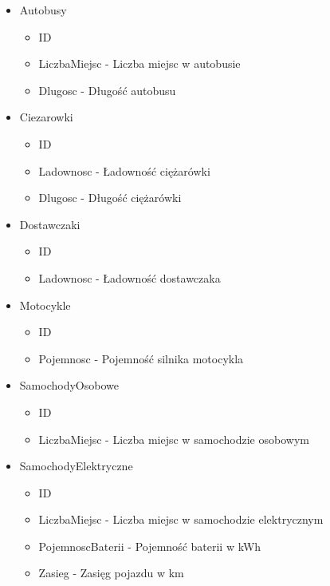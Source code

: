 \begin{itemize}
    \item Autobusy
    \begin{itemize}
        \item ID
        \item LiczbaMiejsc - Liczba miejsc w autobusie
        \item Dlugosc - Długość autobusu
    \end{itemize}
\end{itemize}
\begin{itemize}
    \item Ciezarowki
    \begin{itemize}
        \item ID
        \item Ladownosc - Ładowność ciężarówki
        \item Dlugosc - Długość ciężarówki
    \end{itemize}
\end{itemize}
\begin{itemize}
    \item Dostawczaki
    \begin{itemize}
        \item ID
        \item Ladownosc - Ładowność dostawczaka
    \end{itemize}
\end{itemize}
\begin{itemize}
    \item Motocykle
    \begin{itemize}
        \item ID
        \item Pojemnosc - Pojemność silnika motocykla
    \end{itemize}
\end{itemize}
\begin{itemize}
    \item SamochodyOsobowe
    \begin{itemize}
        \item ID
        \item LiczbaMiejsc - Liczba miejsc w samochodzie osobowym
    \end{itemize}
\end{itemize}
\begin{itemize}
    \item SamochodyElektryczne
    \begin{itemize}
        \item ID
        \item LiczbaMiejsc - Liczba miejsc w samochodzie elektrycznym
        \item PojemnoscBaterii - Pojemność baterii w kWh
        \item Zasieg - Zasięg pojazdu w km  
    \end{itemize}
\end{itemize}


